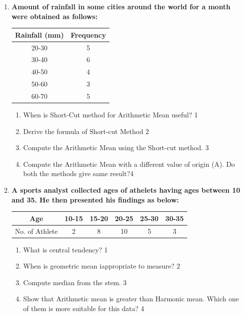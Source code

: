\documentclass[a4paper,oneside]{book}
\begin{document}
\begin{enumerate}
   \item
	  \textbf{Amount of rainfall in some cities around the world for a month were obtained as follows:} 
	  
	      \begin{table}[h]
    \centering
\begin{tabular}{c|c}
\textbf{Rainfall (mm)} & \textbf{Frequency} \\ \hline
20-30                  & 5                  \\ \hline
30-40                  & 6                  \\ \hline
40-50                  & 4                  \\ \hline
50-60                  & 3                  \\
60-70                  & 5                 
\end{tabular}
\end{table}

    \begin{enumerate}
    \item
	When is Short-Cut method for Arithmetic Mean useful? \hfill 1
    \item
	Derive the formula of Short-cut Method \hfill 2
    \item  
	Compute the Arithmetic Mean using the Short-cut method. \hfill 3
    \item
	Compute the Arithmetic Mean with a different value of origin (A). Do both the methods give same result?\hfill 4
  \end{enumerate}
  
     \item
	  \textbf{A sports analyst collected ages of athelets having ages between 10 and 35. He then presented his findings as below:} 
	  
	  \begin{table}[h]
	    \centering
\begin{tabular}{c|c|c|c|c|c}
Age            & 10-15 & 15-20 & 20-25 & 25-30 & 30-35 \\ \hline
No. of Athlete & 2     & 8     & 10    & 5     & 3    
\end{tabular}
\end{table}
  
  \begin{enumerate}
    \item
	What is central tendency? \hfill 1
    \item
	When is geometric mean iappropriate to measure? \hfill 2
    \item  
	Compute median from the stem. \hfill 3
    \item
	Show that Arithmetic mean is greater than Harmonic mean. Which one of them is more suitable for this data? \hfill 4
  \end{enumerate}


\end{enumerate}
\end{document}
